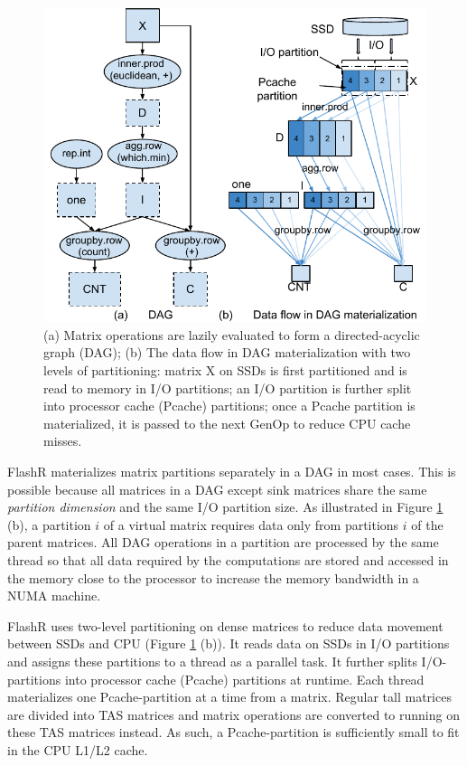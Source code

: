 \begin{figure}
	\centering
	\includegraphics[scale=0.6]{FlashMatrix_figs/kmeans.pdf}
  \vspace{-4pt}
	\caption{(a) Matrix operations are lazily evaluated to form
	a directed-acyclic graph (DAG); (b) The data flow in DAG materialization
	with two levels of partitioning: matrix X on SSDs is first partitioned
	and is read to memory in I/O partitions; an I/O partition is further
	split into processor cache (Pcache) partitions; once a Pcache partition
	is materialized, it is passed to the next GenOp to reduce CPU cache misses. }
	\label{fig:dag}
  \vspace{-8pt}
\end{figure}

FlashR materializes matrix partitions separately in a DAG in most cases.
This is possible because all matrices in a DAG except sink matrices
share the same \textit{partition dimension} and the same I/O partition size.
As illustrated in Figure \ref{fig:dag} (b), a partition $i$ of a virtual
matrix requires data only from partitions
$i$ of the parent matrices.  All DAG operations in a partition are processed by 
the same thread so that all data required by the computations are stored and
accessed in the memory close to the processor to increase the memory bandwidth
in a NUMA machine.

FlashR uses two-level partitioning on dense matrices to reduce data movement
between SSDs and CPU (Figure \ref{fig:dag} (b)). It reads data on SSDs in
I/O partitions and assigns these partitions to a thread as a parallel task.
It further splits I/O-partitions into processor cache (Pcache) partitions
at runtime.  Each thread materializes one Pcache-partition at a time from
a matrix. Regular tall matrices are divided into TAS matrices and matrix
operations are converted to running on these TAS matrices instead. As such,
a Pcache-partition is sufficiently small to fit in the CPU L1/L2 cache.

